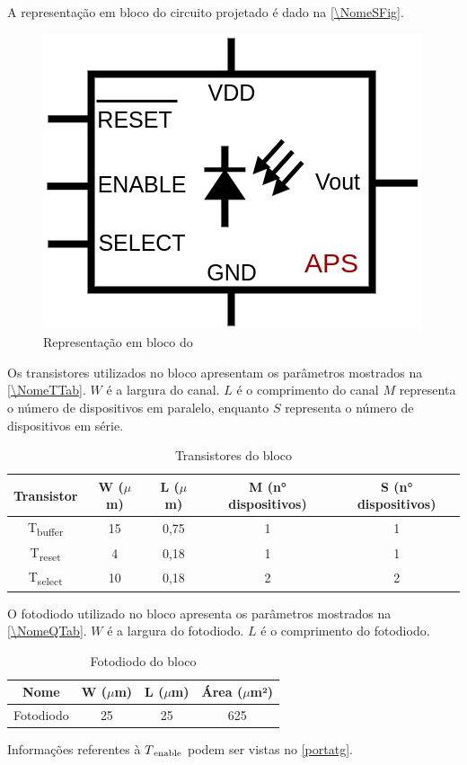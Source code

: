 A representação em bloco do circuito projetado é dado na \autoref{\NomeSFig}.

\begin{figure}[!h]
 \centering
    \centering
    \caption{\label{\NomeSFig}Representação em bloco do \NomeBloco} 
    \includegraphics[scale=0.3]{Circuitos/APS_block.png}
\end{figure}

Os transistores utilizados no bloco apresentam os par\^ametros mostrados na \autoref{\NomeTTab}. $W$ é a largura do canal. $L$ é o comprimento do canal $M$ representa o número de dispositivos em paralelo, enquanto $S$ representa o número de dispositivos em série.

\begin{table}[!h]
\caption{Transistores do bloco \NomeBloco}
\label{\NomeTTab}
\centering
\begin{tabular}{ccccc}
\toprule
Transistor & W ($\mu$m)  & L ($\mu$m)           & M (n° dispositivos) & S (n° dispositivos)\\
\midrule \midrule
T\textsubscript{buffer} & 15 & 0,75 & 1 & 1\\
\midrule
T\textsubscript{reset} & 4 & 0,18 & 1 & 1\\
\midrule
T\textsubscript{select} & 10 & 0,18 & 2 & 2\\
\bottomrule
\end{tabular}
\end{table}

O fotodiodo utilizado no bloco apresenta os par\^ametros mostrados na \autoref{\NomeQTab}. $W$ é a largura do fotodiodo. $L$ é o comprimento do fotodiodo.

\begin{table}[!h]
\caption{Fotodiodo do bloco \NomeBloco}
\label{\NomeQTab}
\centering
\begin{tabular}{cccc}
\toprule
Nome & W ($\mu$m)  & L ($\mu$m) & Área ($\mu$m²)\\
\midrule \midrule
Fotodiodo & 25 & 25 & 625\\
\bottomrule
\end{tabular}
\end{table}

Informações referentes à $T\textsubscript{enable}$ podem ser vistas no \autoref{portatg}.